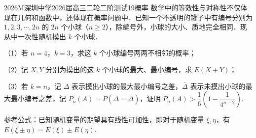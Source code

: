 
\begin{problem}{2026}{M}{深圳中学2026届高三二轮二阶测试}{19}{概率}
数学中的等效性与对称性不仅体现在几何和函数中，还体现在概率问题中．已知一个不透明的罐子中有编号分别为 $1,2,3,\cdots,2n$ 的 $2n$ 个小球（$n\geq2$），除编号外，小球的大小、质地完全相同．现从中一次性随机摸出 $k$ 个小球．

（1）若 $n=4$，$k=3$，求这 $k$ 个小球编号两两不相邻的概率；

（2）记 $X,Y$ 分别为摸出的这 $k$ 个小球的最大、最小编号，求 $E(X+Y)$；

（3）若 $k=n$，记 $\Delta$ 表示摸出小球的最大最小编号之差，$\bar{\Delta}$ 表示未摸出小球的最大最小编号之差，记 $P_n(A)=P(\Delta=\bar{\Delta})$，证明 $P_n(A)>\dfrac{1}{6}\left(1-\dfrac{1}{4^{n-2}}\right)$.

参考公式：已知随机变量的期望具有线性可加性，即对于随机变量 $\xi,\eta$，有 $E(\xi\pm\eta)=E(\xi)\pm E(\eta)$.
\end{problem}